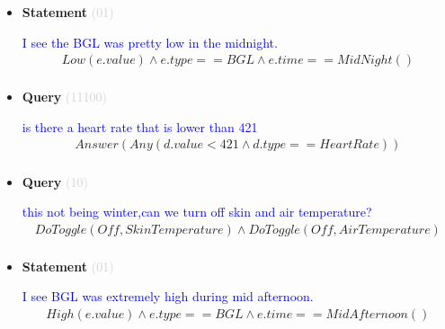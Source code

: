 \documentclass[11pt]{article}
\newcommand{\key}[1]{\textcolor{lightgray}{#1}}
\newcounter{CQuery}
\newcounter{CStatement}
\begin{document}
\begin{itemize}
\item
\textbf{Statement\theCStatement} \key{(01)} \addtocounter{CStatement}{1}
\textcolor{blue}{ I see the BGL was pretty low in the midnight. }
\begin{multline*}
Low(e.value) \wedge e.type==BGL \wedge e.time==MidNight() \\ 
\end{multline*}


\item
\textbf{Query\theCQuery} \key{(11100)} \addtocounter{CQuery}{1}
\textcolor{blue}{ is there a heart rate that is lower than 421 }
\begin{multline*}
Answer(Any(d.value<421 \wedge d.type==HeartRate)) \\ 
\end{multline*}


\item
\textbf{Query\theCQuery} \key{(10)} \addtocounter{CQuery}{1}
\textcolor{blue}{ this not being winter,can we turn off skin and air temperature? }
\begin{multline*}
DoToggle(Off, SkinTemperature) \wedge DoToggle(Off, AirTemperature) \\ 
\end{multline*}


\item
\textbf{Statement\theCStatement} \key{(01)} \addtocounter{CStatement}{1}
\textcolor{blue}{ I see BGL was extremely high during mid afternoon. }
\begin{multline*}
High(e.value) \wedge e.type==BGL \wedge e.time==MidAfternoon() \\ 
\end{multline*}


\end{itemize}
\end{document}
